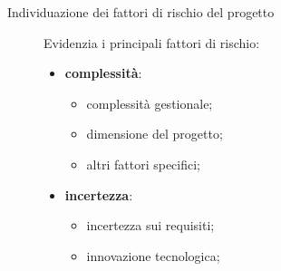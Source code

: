 \begin{description}
    \item[Individuazione dei fattori di rischio del progetto] Evidenzia i principali fattori di rischio:
        \begin{itemize}
            \item \textbf{complessità}:
                \begin{itemize}
                    \item complessità gestionale;
                    \item dimensione del progetto;
                    \item altri fattori specifici;
                \end{itemize}
            \item \textbf{incertezza}:
                \begin{itemize}
                    \item incertezza sui requisiti;
                    \item innovazione tecnologica;
                \end{itemize}
        \end{itemize}
    

\end{description}
